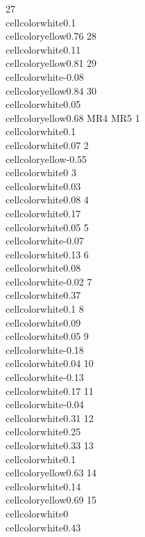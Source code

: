 \documentclass{article}\usepackage[]{graphicx}\usepackage[]{color}
\begin{document}
27   \\cellcolor{white}{0.1} \\cellcolor{yellow}{0.76}
28  \\cellcolor{white}{0.11} \\cellcolor{yellow}{0.81}
29 \\cellcolor{white}{-0.08} \\cellcolor{yellow}{0.84}
30  \\cellcolor{white}{0.05} \\cellcolor{yellow}{0.68}
                          MR4                       MR5
1     \\cellcolor{white}{0.1}  \\cellcolor{white}{0.07}
2  \\cellcolor{yellow}{-0.55}     \\cellcolor{white}{0}
3    \\cellcolor{white}{0.03}  \\cellcolor{white}{0.08}
4    \\cellcolor{white}{0.17}  \\cellcolor{white}{0.05}
5   \\cellcolor{white}{-0.07}  \\cellcolor{white}{0.13}
6    \\cellcolor{white}{0.08} \\cellcolor{white}{-0.02}
7    \\cellcolor{white}{0.37}   \\cellcolor{white}{0.1}
8    \\cellcolor{white}{0.09}  \\cellcolor{white}{0.05}
9   \\cellcolor{white}{-0.18}  \\cellcolor{white}{0.04}
10  \\cellcolor{white}{-0.13}  \\cellcolor{white}{0.17}
11  \\cellcolor{white}{-0.04}  \\cellcolor{white}{0.31}
12   \\cellcolor{white}{0.25}  \\cellcolor{white}{0.33}
13    \\cellcolor{white}{0.1} \\cellcolor{yellow}{0.63}
14   \\cellcolor{white}{0.14} \\cellcolor{yellow}{0.69}
15      \\cellcolor{white}{0}  \\cellcolor{white}{0.43}
\end{document}
